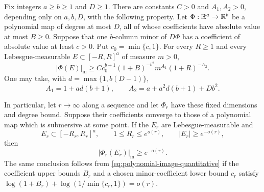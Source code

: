 \begin{lemma}
\label{lem:polynomial-image}
Fix integers $a\ge b\ge1$ and $D\ge1$.  There are constants
$C>0$ and $A_1,A_2>0$, depending only on $a,b,D$, with the following
property.  Let $\Phi:\mathbb R^a\to\mathbb R^b$ be a polynomial map of degree at most
$D$, all of whose coefficients have absolute value at most $B\ge0$.
Suppose that one $b$-column minor of $D\Phi$ has a coefficient of absolute
value at least $c>0$.  Put $c_0=\min\{c,1\}$.
For every $R\ge1$ and every Lebesgue-measurable
$E\subset[-R,R]^a$ of measure $m>0$,
\begin{equation}
\label{eq:polynomial-image-quantitative}
 |\Phi(E)|_{\mathrm{in}}
 \ge C c_0^{b+1}(1+B)^{-b^2}
          m^{A_1}(1+R)^{-A_2}.
\end{equation}
One may take, with $d=\max\{1,b(D-1)\}$,
\[
 A_1=1+ad(b+1),\qquad
 A_2=a+a^2d(b+1)+Db^2.
\]

In particular, let $r\to\infty$ along a sequence and let $\Phi_r$
have these fixed dimensions and degree bound.  Suppose their
coefficients converge to those of a polynomial map which is
submersive at some point.  If the $E_r$ are Lebesgue-measurable and
\[
 E_r\subset[-R_r,R_r]^a,\qquad
 1\le R_r\le e^{o(r)},\qquad |E_r|\ge e^{-o(r)},
\]
then
\begin{equation}
\label{eq:polynomial-image-subexponential}
 |\Phi_r(E_r)|_{\mathrm{in}}\ge e^{-o(r)}.
\end{equation}
The same conclusion follows from
\eqref{eq:polynomial-image-quantitative} if the coefficient upper bounds
$B_r$ and a chosen minor-coefficient lower bound $c_r$ satisfy
$\log(1+B_r)+\log(1/\min\{c_r,1\})=o(r)$.
\end{lemma}

